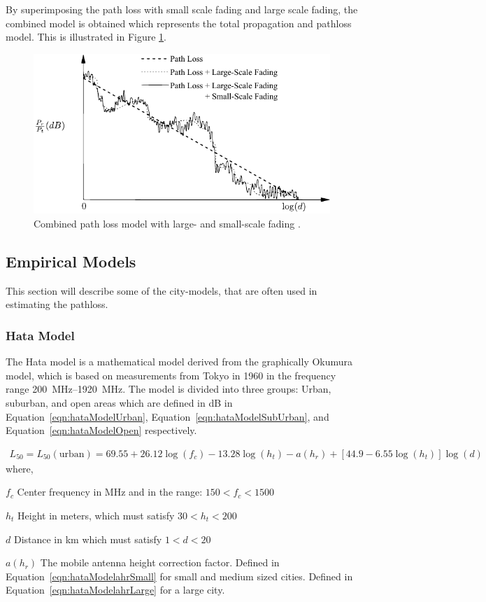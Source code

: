 By superimposing the path loss with small scale fading and large scale fading, the combined model is obtained which represents the total propagation and pathloss model. This is illustrated in Figure \ref{fig:mul_combined}. 

\begin{figure}[htbp]
    \centering
    \includegraphics{img/analysis/goldsmith_combined}
    \caption{Combined path loss model with large- and small-scale fading \cite{goldsmith2005wireless}.}
    \label{fig:mul_combined}
\end{figure}

\subsection{Empirical Models}
This section will describe some of the city-models, that are often used in estimating the pathloss. 

\subsubsection{Hata Model}
The Hata model is a mathematical model derived from the graphically Okumura model, which is based on measurements from Tokyo in 1960 in the frequency range \SIrange{200}{1920}{MHz}. The model is divided into three groups: Urban, suburban, and open areas which are defined in dB in Equation~\ref{eqn:hataModelUrban}, Equation~\ref{eqn:hataModelSubUrban}, and Equation~\ref{eqn:hataModelOpen} respectively\cite{Seybold2005introduction}.

\begin{align} 
\label{eqn:hataModelUrban}
L_{50} = L_{50}(\text{urban}) = 69.55+26.12 \log(f_c) - 13.28 \log(h_t) -a(h_r) + [44.9-6.55 \log(h_t)] \log(d)
\end{align} 
where, 
\begin{where}
\item [$f_{c}$] Center frequency in \si{MHz} and in the range: $150 < f_c < 1500$
\item [$h_t$] Height in meters, which must satisfy $30 < h_t < 200$
\item [$d$] Distance in km which must satisfy $1 < d < 20$
\item [$a(h_r)$] The mobile antenna height correction factor. Defined in Equation~\ref{eqn:hataModelahrSmall}\cite{Seybold2005introduction} for small and medium sized cities. Defined in Equation~\ref{eqn:hataModelahrLarge}\cite{Seybold2005introduction} for a large city. 
\end{where}

